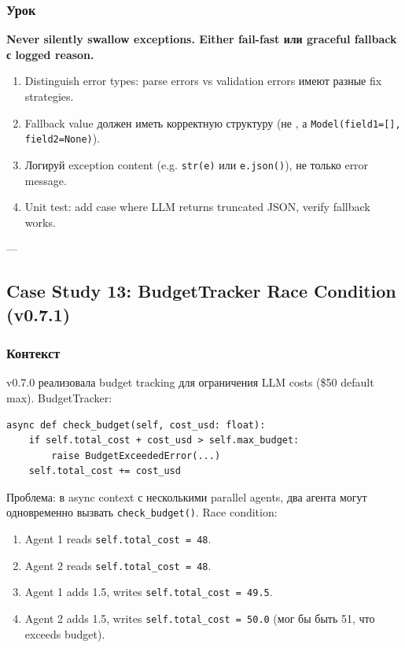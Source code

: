 \subsubsection*{Урок}
\textbf{Never silently swallow exceptions. Either fail-fast или graceful fallback с logged reason.}

\begin{enumerate}
\item Distinguish error types: parse errors vs validation errors имеют разные fix strategies.
\item Fallback value должен иметь корректную структуру (не \texttt{{}}, а \texttt{Model(field1=[], field2=None)}).
\item Логируй exception content (e.g. \texttt{str(e)} или \texttt{e.json()}), не только error message.
\item Unit test: add case where LLM returns truncated JSON, verify fallback works.
\end{enumerate}

---

\subsection{Case Study 13: BudgetTracker Race Condition (v0.7.1)}

\subsubsection*{Контекст}
v0.7.0 реализовала budget tracking для ограничения LLM costs (\$50 default max). BudgetTracker:

\begin{verbatim}
async def check_budget(self, cost_usd: float):
    if self.total_cost + cost_usd > self.max_budget:
        raise BudgetExceededError(...)
    self.total_cost += cost_usd
\end{verbatim}

Проблема: в async context с несколькими parallel agents, два агента могут одновременно вызвать \texttt{check\_budget()}. Race condition:
\begin{enumerate}
\item Agent 1 reads \texttt{self.total\_cost = 48}.
\item Agent 2 reads \texttt{self.total\_cost = 48}.
\item Agent 1 adds 1.5, writes \texttt{self.total\_cost = 49.5}.
\item Agent 2 adds 1.5, writes \texttt{self.total\_cost = 50.0} (мог бы быть 51, что exceeds budget).
\end{enumerate}

